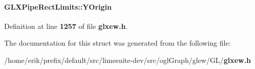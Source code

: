 \paragraph[{Y\+Origin}]{ G\+L\+X\+Pipe\+Rect\+Limits\+::\+Y\+Origin}\label{structGLXPipeRectLimits_a50e06bcf0dae95854be7d93a515199e9}


Definition at line {\bf 1257} of file {\bf glxew.\+h}.



The documentation for this struct was generated from the following file\+:\begin{DoxyCompactItemize}
\item 
/home/erik/prefix/default/src/limesuite-\/dev/src/ogl\+Graph/glew/\+G\+L/{\bf glxew.\+h}\end{DoxyCompactItemize}
